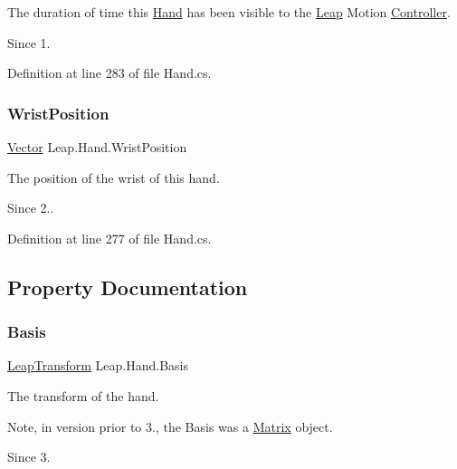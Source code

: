 The duration of time this \mbox{\hyperlink{class_leap_1_1_hand}{Hand}} has been visible to the \mbox{\hyperlink{namespace_leap}{Leap}} Motion \mbox{\hyperlink{class_leap_1_1_controller}{Controller}}. 

\begin{DoxySince}{Since}
1. 
\end{DoxySince}


Definition at line 283 of file Hand.\+cs.

\mbox{\label{class_leap_1_1_hand_a18030f2fe8236bfcfc9be404eb3c9a57}} 
\subsubsection{\texorpdfstring{WristPosition}{WristPosition}}
{\footnotesize\ttfamily \mbox{\hyperlink{struct_leap_1_1_vector}{Vector}} Leap.\+Hand.\+Wrist\+Position}



The position of the wrist of this hand. 

\begin{DoxySince}{Since}
2.. 
\end{DoxySince}


Definition at line 277 of file Hand.\+cs.



\subsection{Property Documentation}
\mbox{\label{class_leap_1_1_hand_a31cd466c474963af5727269c7c9d6b5a}} 
\subsubsection{\texorpdfstring{Basis}{Basis}}
{\footnotesize\ttfamily \mbox{\hyperlink{struct_leap_1_1_leap_transform}{Leap\+Transform}} Leap.\+Hand.\+Basis\hspace{0.3cm}{\ttfamily [get]}}



The transform of the hand. 

Note, in version prior to 3., the Basis was a \mbox{\hyperlink{struct_leap_1_1_matrix}{Matrix}} object. \begin{DoxySince}{Since}
3. 
\end{DoxySince}



